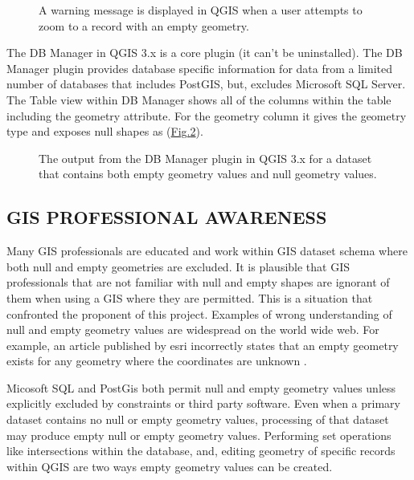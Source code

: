 \documentclass[letterpaper,10pt,english]{sphinxmanual}
\begin{document}
\begin{figure}[htbp]
\centering
\capstart

\noindent{}
\caption{A warning message is displayed in QGIS when a user attempts to zoom to a record with an empty geometry.}\label{\detokenize{concept:id58}}\label{\detokenize{concept:figureiii}}\end{figure}

The DB Manager in QGIS 3.x is a core plugin (it can’t be uninstalled).  The DB Manager plugin provides database specific information for data from a limited number of databases that includes PostGIS, but, excludes Microsoft SQL Server.  The Table view within DB Manager shows all of the columns within the table including the geometry attribute.  For the geometry column it gives the geometry type and exposes null shapes as  (\hyperref[\detokenize{concept:figureiv}]{Fig.\@ \ref{\detokenize{concept:figureiv}}}).

\begin{figure}[htbp]
\centering
\capstart

\noindent{}
\caption{The output from the DB Manager plugin in QGIS 3.x for a dataset that contains both empty geometry values and null geometry values.}\label{\detokenize{concept:id59}}\label{\detokenize{concept:figureiv}}\end{figure}


\subsection{GIS PROFESSIONAL AWARENESS}
\label{\detokenize{concept:gis-professional-awareness}}
Many GIS professionals are educated and work within GIS dataset schema where both null and empty geometries are excluded.  It is plausible that GIS professionals that are not familiar with null and empty shapes are ignorant of them when using a GIS where they are permitted.  This is a situation that confronted the proponent of this project.  Examples of wrong understanding of null and empty geometry values are widespread on the world wide web.  For example, an article published by esri incorrectly states that an empty geometry exists for any geometry where the coordinates are unknown .

Micosoft SQL and PostGis both permit null and empty geometry values unless explicitly excluded by constraints or third party software.  Even when a primary dataset contains no null or empty geometry values, processing of that dataset may produce empty null or empty geometry values.  Performing set operations like intersections within the database, and, editing geometry of specific records within QGIS are two ways empty geometry values can be created.
\end{document}
